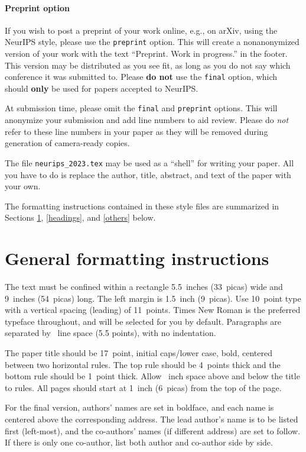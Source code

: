 \documentclass{article}
\begin{document}
\paragraph{Preprint option}
If you wish to post a preprint of your work online, e.g., on arXiv, using the
NeurIPS style, please use the \verb+preprint+ option. This will create a
nonanonymized version of your work with the text ``Preprint. Work in progress.''
in the footer. This version may be distributed as you see fit, as long as you do not say which conference it was submitted to. Please \textbf{do
  not} use the \verb+final+ option, which should \textbf{only} be used for
papers accepted to NeurIPS. 


At submission time, please omit the \verb+final+ and \verb+preprint+
options. This will anonymize your submission and add line numbers to aid
review. Please do \emph{not} refer to these line numbers in your paper as they
will be removed during generation of camera-ready copies.


The file \verb+neurips_2023.tex+ may be used as a ``shell'' for writing your
paper. All you have to do is replace the author, title, abstract, and text of
the paper with your own.


The formatting instructions contained in these style files are summarized in
Sections \ref{gen_inst}, \ref{headings}, and \ref{others} below.


\section{General formatting instructions}
\label{gen_inst}


The text must be confined within a rectangle 5.5~inches (33~picas) wide and
9~inches (54~picas) long. The left margin is 1.5~inch (9~picas).  Use 10~point
type with a vertical spacing (leading) of 11~points.  Times New Roman is the
preferred typeface throughout, and will be selected for you by default.
Paragraphs are separated by ~line space (5.5 points), with no
indentation.


The paper title should be 17~point, initial caps/lower case, bold, centered
between two horizontal rules. The top rule should be 4~points thick and the
bottom rule should be 1~point thick. Allow ~inch space above and
below the title to rules. All pages should start at 1~inch (6~picas) from the
top of the page.


For the final version, authors' names are set in boldface, and each name is
centered above the corresponding address. The lead author's name is to be listed
first (left-most), and the co-authors' names (if different address) are set to
follow. If there is only one co-author, list both author and co-author side by
side.
\end{document}

